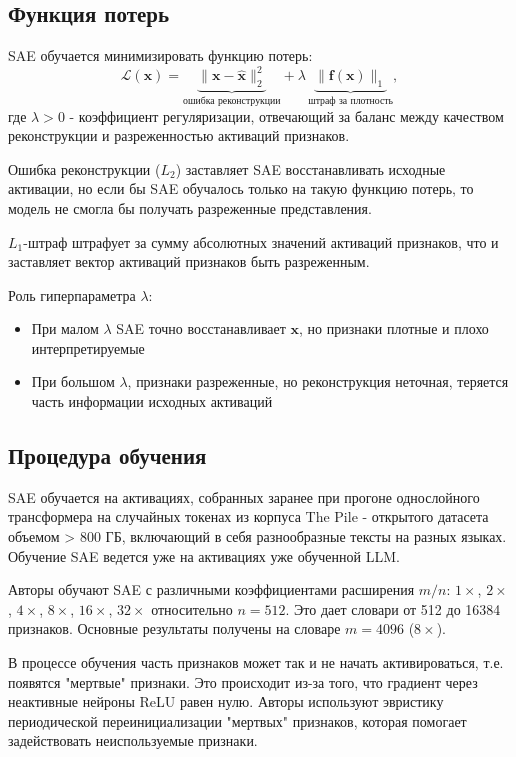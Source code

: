 \documentclass[a4paper,14pt]{extreport}
\begin{document}
\subsection{Функция потерь}

SAE обучается минимизировать функцию потерь:
\begin{equation}
    \mathcal{L}(\mathbf{x}) = \underbrace{\|\mathbf{x} - \hat{\mathbf{x}}\|_2^2}_{\text{ошибка реконструкции}} + \lambda\,\underbrace{\|\mathbf{f}(\mathbf{x})\|_1}_{\text{штраф за плотность}},
    \label{eq:loss}
\end{equation}
где $\lambda > 0$ - коэффициент регуляризации, отвечающий за баланс между
качеством реконструкции и разреженностью активаций признаков.

Ошибка реконструкции ($L_2$) заставляет SAE восстанавливать исходные активации, но если бы SAE
обучалось только на такую функцию потерь, то модель не смогла бы получать разреженные представления.

$L_1$-штраф штрафует за сумму абсолютных значений активаций признаков, что и заставляет 
вектор активаций признаков быть разреженным.

Роль гиперпараметра $\lambda$:
\begin{itemize}
    \item При малом $\lambda$ SAE точно восстанавливает $\mathbf{x}$, но признаки плотные
          и плохо интерпретируемые
    \item При большом $\lambda$, признаки разреженные, но реконструкция неточная,
          теряется часть информации исходных активаций
\end{itemize}

\subsection{Процедура обучения}

SAE обучается на активациях, собранных заранее при прогоне однослойного трансформера на
случайных токенах из корпуса The Pile \cite{gao2020pile} - открытого датасета объемом
> 800 ГБ, включающий в себя разнообразные тексты на разных языках. Обучение SAE
ведется уже на активациях уже обученной LLM.

Авторы обучают SAE с различными коэффициентами расширения $m/n$:
$1\times$, $2\times$, $4\times$, $8\times$, $16\times$, $32\times$ относительно $n = 512$.
Это дает словари от 512 до 16384 признаков. Основные результаты получены на
словаре $m = 4096$ ($8\times$).

В процессе обучения часть признаков может так и не начать активироваться, т.е. появятся
"мертвые" признаки. Это происходит из-за того, что градиент через неактивные нейроны ReLU равен нулю.
Авторы используют эвристику периодической переинициализации "мертвых" признаков, которая
помогает задействовать неиспользуемые признаки.
\end{document}
